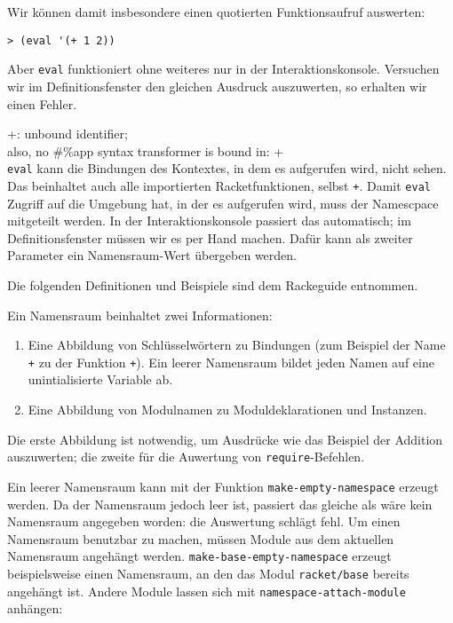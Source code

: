 Wir können damit insbesondere einen quotierten Funktionsaufruf auswerten:

\begin{lstlisting}
> (eval '(+ 1 2))
\end{lstlisting}
{}

Aber \texttt{eval} funktioniert ohne weiteres nur in der Interaktionskonsole. Versuchen wir im Definitionsfenster den gleichen Ausdruck auszuwerten, so erhalten wir einen Fehler.

{\color{red}\ttfamily\small\hspace{5pt} +: unbound identifier;}\\
{\color{red}\ttfamily\small\hspace{5pt} also, no \#\%app syntax transformer is bound in: +}\\

\texttt{eval} kann die Bindungen des Kontextes, in dem es aufgerufen wird, nicht sehen. Das beinhaltet auch alle importierten Racketfunktionen, selbst \texttt{+}. Damit \texttt{eval} Zugriff auf die Umgebung hat, in der es aufgerufen wird, muss der Namescpace mitgeteilt werden. In der Interaktionskonsole passiert das automatisch; im Definitionsfenster müssen wir es per Hand machen. Dafür kann als zweiter Parameter ein Namensraum-Wert übergeben werden. 

Die folgenden Definitionen und Beispiele sind dem Rackeguide \cite{racketguide-namespace} entnommen.

Ein Namensraum beinhaltet zwei Informationen:
\begin{enumerate}
 \item Eine Abbildung von Schlüsselwörtern zu Bindungen (zum Beispiel der Name \texttt{+} zu der Funktion \texttt{+}). Ein leerer Namensraum bildet jeden Namen auf eine unintialisierte Variable ab.
 \item Eine Abbildung von Modulnamen zu Moduldeklarationen und Instanzen.
\end{enumerate}

Die erste Abbildung ist notwendig, um Ausdrücke wie das Beispiel der Addition auszuwerten; die zweite für die Auwertung von \texttt{require}-Befehlen.

Ein leerer Namensraum kann mit der Funktion \texttt{make-empty-namespace} erzeugt werden. Da der Namensraum jedoch leer ist, passiert das gleiche als wäre kein Namensraum angegeben worden: die Auswertung schlägt fehl. Um einen Namensraum benutzbar zu machen, müssen Module aus dem aktuellen Namensraum angehängt werden. \texttt{make-base-empty-namespace} erzeugt beispielsweise einen Namensraum, an den das Modul \texttt{racket/base} bereits angehängt ist. Andere Module lassen sich mit \texttt{namespace-attach-module} anhängen:

